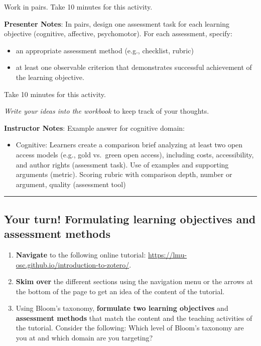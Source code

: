 \documentclass[
  letterpaper,
  DIV=11,
  numbers=noendperiod]{scrartcl}
\providecommand{\tightlist}{%
  \setlength{\itemsep}{0pt}\setlength{\parskip}{0pt}}
\begin{document}
Work in pairs. Take 10 minutes for this activity.

\textbf{Presenter Notes}: In pairs, design one assessment task for each
learning objective (cognitive, affective, psychomotor). For each
assessment, specify:

\begin{itemize}
\item
  an appropriate assessment method (e.g., checklist, rubric)
\item
  at least one observable criterion that demonstrates successful
  achievement of the learning objective.
\end{itemize}

Take 10 minutes for this activity.

\emph{Write your ideas into the workbook} to keep track of your
thoughts.

\textbf{Instructor Notes}: Example answer for cognitive domain:

\begin{itemize}
\tightlist
\item
  Cognitive: Learners create a comparison brief analyzing at least two
  open access models (e.g., gold vs.~green open access), including
  costs, accessibility, and author rights (assessment task). Use of
  examples and supporting arguments (metric). Scoring rubric with
  comparison depth, number or argument, quality (assessment tool)
\end{itemize}

\begin{center}\rule{0.5\linewidth}{0.5pt}\end{center}

\subsection{Your turn! Formulating learning objectives and assessment
methods}\label{your-turn-formulating-learning-objectives-and-assessment-methods}

\begin{enumerate}
\def\labelenumi{\arabic{enumi}.}
\item
  \textbf{Navigate} to the following online tutorial:
  \url{https://lmu-osc.github.io/introduction-to-zotero/}.
\item
  \textbf{Skim over} the different sections using the navigation menu or
  the arrows at the bottom of the page to get an idea of the content of
  the tutorial.
\item
  Using Bloom's taxonomy, \textbf{formulate two learning objectives} and
  \textbf{assessment methods} that match the content and the teaching
  activities of the tutorial. Consider the following: Which level of
  Bloom's taxonomy are you at and which domain are you targeting?
\end{enumerate}
\end{document}
